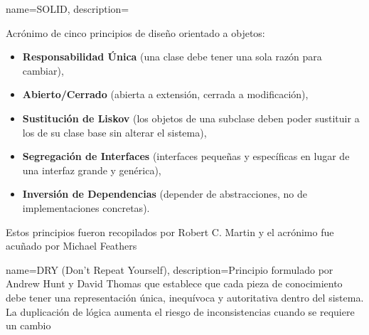 


{
  name={SOLID},
  description={Acrónimo de cinco principios de diseño orientado a objetos: 
  \begin{itemize}
  \item \textbf{Responsabilidad Única} (una clase debe tener una sola razón para cambiar), 
  \item \textbf{Abierto/Cerrado} (abierta a extensión, cerrada a modificación), 
  \item \textbf{Sustitución de Liskov} (los objetos de una subclase deben poder sustituir a los de su clase base sin alterar el sistema), 
  \item \textbf{Segregación de Interfaces} (interfaces pequeñas y específicas en lugar de una interfaz grande y genérica), 
  \item \textbf{Inversión de Dependencias} (depender de abstracciones, no de implementaciones concretas). 
  \end{itemize}
  Estos principios fueron recopilados por Robert C. Martin \cite{martin2000} y el acrónimo fue acuñado por Michael Feathers \cite{feathers2004}}
}

{
  name={DRY (Don't Repeat Yourself)},
  description={Principio formulado por Andrew Hunt y David Thomas que establece que cada pieza de conocimiento debe tener una representación única, inequívoca y autoritativa dentro del sistema. La duplicación de lógica aumenta el riesgo de inconsistencias cuando se requiere un cambio \cite{hunt1999}}
}



